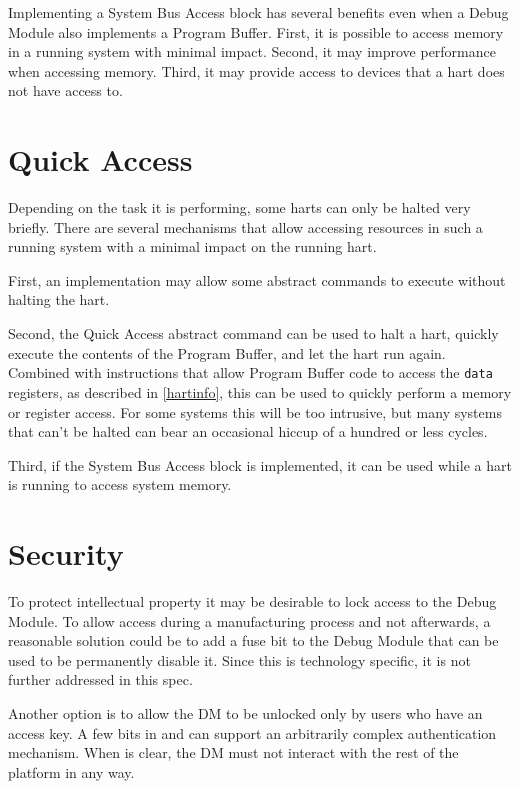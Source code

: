 \begin{commentary}
Implementing a System Bus Access block has several benefits even
when a Debug Module also implements a Program Buffer. 
First, it is possible to
access memory in a running system with minimal impact.  Second, it may improve
performance when accessing memory.
Third, it may provide
access to devices that a hart does not have access to.
\end{commentary}

\section{Quick Access}

Depending on the task it is performing, some harts can only be halted very briefly.
There are several mechanisms that allow accessing resources in such a running system
with a minimal impact on the running hart.

First, an implementation may allow some abstract commands to execute without halting the hart.

Second, the Quick Access abstract command can be used to halt a hart, quickly
execute the contents of the Program Buffer, and let the hart run again.
Combined with instructions that allow Program Buffer code to access the
{\tt data} registers, as described in \ref{hartinfo}, this can be used to quickly
perform a memory or register access. For some systems this will be too
intrusive, but many systems that can't be halted can bear an occasional hiccup
of a hundred or less cycles.

Third, if the System Bus Access block is implemented, it can be used while a
hart is running to access system memory.

\section{Security}

To protect intellectual property it may be desirable to lock access to the
Debug Module.  To allow access during a manufacturing process and not
afterwards, a reasonable solution could be to add a fuse bit to the Debug
Module that can be used to be permanently disable it. Since this is technology
specific, it is not further addressed in this spec.

Another option is to allow the DM to be unlocked only by users who have an
access key. A few bits in \Rdmstatus and \Rauthdata can support an arbitrarily
complex authentication mechanism.  When \Fauthenticated is clear, the DM must
not interact with the rest of the platform in any way.


